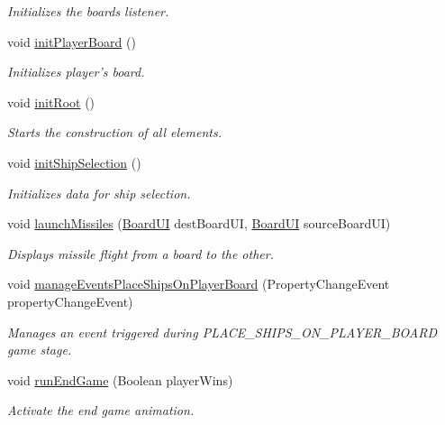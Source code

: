 \begin{DoxyCompactItemize}
\begin{DoxyCompactList}\small\item\em Initializes the boards listener. \end{DoxyCompactList}\item 
void \hyperlink{classbattleship2D_1_1ui_1_1MainFrame_a906e2a3f9366ae3cec8de72aa3ee7bd4}{init\-Player\-Board} ()
\begin{DoxyCompactList}\small\item\em Initializes player's board. \end{DoxyCompactList}\item 
void \hyperlink{classbattleship2D_1_1ui_1_1MainFrame_aa4634a800db2491bce8f6962863a5eb8}{init\-Root} ()
\begin{DoxyCompactList}\small\item\em Starts the construction of all elements. \end{DoxyCompactList}\item 
void \hyperlink{classbattleship2D_1_1ui_1_1MainFrame_a3fa6a0e00dca1d1e1d540d01c01a984d}{init\-Ship\-Selection} ()
\begin{DoxyCompactList}\small\item\em Initializes data for ship selection. \end{DoxyCompactList}\item 
void \hyperlink{classbattleship2D_1_1ui_1_1MainFrame_a305059eafca030a1139aab34b95c308f}{launch\-Missiles} (\hyperlink{classbattleship2D_1_1ui_1_1BoardUI}{Board\-U\-I} dest\-Board\-U\-I, \hyperlink{classbattleship2D_1_1ui_1_1BoardUI}{Board\-U\-I} source\-Board\-U\-I)
\begin{DoxyCompactList}\small\item\em Displays missile flight from a board to the other. \end{DoxyCompactList}\item 
void \hyperlink{classbattleship2D_1_1ui_1_1MainFrame_af853c73c8abaed14cb2c64bb1f86d7e9}{manage\-Events\-Place\-Ships\-On\-Player\-Board} (Property\-Change\-Event property\-Change\-Event)
\begin{DoxyCompactList}\small\item\em Manages an event triggered during P\-L\-A\-C\-E\-\_\-\-S\-H\-I\-P\-S\-\_\-\-O\-N\-\_\-\-P\-L\-A\-Y\-E\-R\-\_\-\-B\-O\-A\-R\-D game stage. \end{DoxyCompactList}\item 
void \hyperlink{classbattleship2D_1_1ui_1_1MainFrame_a5ebc3f74994bb4df16418e1c992120c1}{run\-End\-Game} (Boolean player\-Wins)
\begin{DoxyCompactList}\small\item\em Activate the end game animation. \end{DoxyCompactList}\item 

\end{DoxyCompactItemize}
